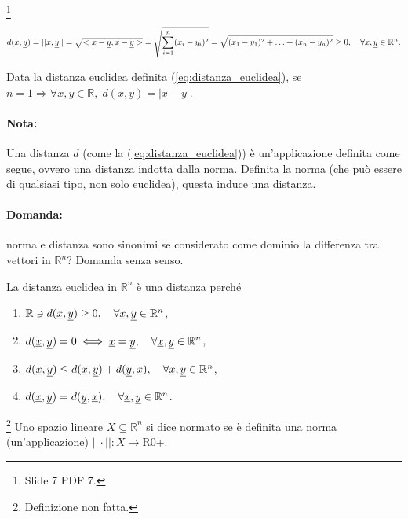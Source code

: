 \begin{definition}\footnote{Slide 7 PDF 7.}
    \begin{equation}\label{eq:distanza_euclidea}
        d(\uline x,\uline y)=||\uline x,\uline y||=\sqrt{<\uline x-\uline y, \uline x-\uline y>}=\sqrt{\sum_{i=1}^n(x_i-y_i)^2}=\sqrt{(x_1-y_1)^2+\hdots+(x_n-y_n)^2}\geq 0,\quad\forall\uline x,\uline y\in\mathbb R^n.
    \end{equation}
\end{definition}

\begin{remark}
    Data la distanza euclidea definita (\ref{eq:distanza_euclidea}), se $n=1\Rightarrow \forall x,y\in\mathbb R,\; d(x,y)=|x-y|$.
\end{remark}

\paragraph{Nota:} Una distanza $d$ (come la (\ref{eq:distanza_euclidea})) è un'applicazione definita come segue, ovvero una distanza indotta dalla norma. Definita la norma (che può essere di qualsiasi tipo, non solo euclidea), questa induce una distanza.

\paragraph{Domanda:} norma e distanza sono sinonimi se considerato come dominio la differenza tra vettori in $\mathbb R^n$? Domanda senza senso.

\begin{example}
    La distanza euclidea in $\mathbb R^n$ è una distanza perché
    \begin{enumerate}
        \item $\mathbb R\ni d(\uline x, \uline y)\geq 0,\quad\forall\uline x,\uline y\in\mathbb R^n$,
        \item $d(\uline x,\uline y)=0\iff \uline x=\uline y,\quad\forall\uline x,\uline y\in\mathbb R^n$,
        \item $d(\uline x,\uline y)\leq d(\uline x,\uline y) +d(\uline y,\uline x),\quad\forall\uline x,\uline y\in\mathbb R^n$,
        \item $d(\uline x,\uline y) = d(\uline y, \uline x), \quad\forall\uline x,\uline y\in\mathbb R^n$.
    \end{enumerate}
\end{example}

\begin{definition}\label{def:spazio_normato}\footnote{Definizione non fatta.}
    Uno \gls{spazio lineare} $X\subseteq \mathbb R^n$ si dice normato se è definita una norma (un'applicazione) $||\cdot||\colon X\rightarrow$\gls{R0+}.
\end{definition}

